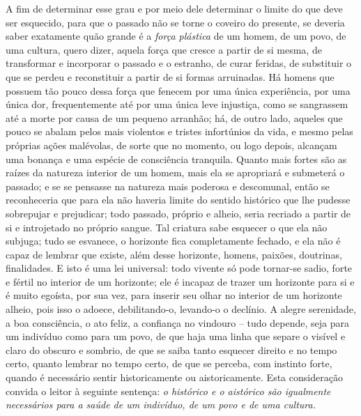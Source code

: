 A fim de determinar esse grau e por meio dele determinar o limite do que
deve ser esquecido, para que o passado não se torne o coveiro do
presente, se deveria saber exatamente quão grande é a \emph{força
plástica} de um homem, de um povo, de uma cultura, quero dizer, aquela
força que cresce a partir de si mesma, de transformar e incorporar o
passado e o estranho, de curar feridas, de substituir o que se perdeu e
reconstituir a partir de si formas arruinadas. Há homens que possuem tão
pouco dessa força que fenecem por uma única experiência, por uma única
dor, frequentemente até por uma única leve injustiça, como se sangrassem
até a morte por causa de um pequeno arranhão; há, de outro lado, aqueles
que pouco se abalam pelos mais violentos e tristes infortúnios da vida,
e mesmo pelas próprias ações malévolas, de sorte que no momento, ou logo
depois, alcançam uma bonança e uma espécie de consciência tranquila.
Quanto mais fortes são as raízes da natureza interior de um homem, mais
ela se apropriará e submeterá o passado; e se se pensasse na natureza
mais poderosa e descomunal, então se reconheceria que para ela não
haveria limite do sentido histórico que lhe pudesse sobrepujar e
prejudicar; todo passado, próprio e alheio, seria recriado a partir de
si e introjetado no próprio sangue. Tal criatura sabe esquecer o que ela
não subjuga; tudo se esvanece, o horizonte fica completamente fechado, e
ela não é capaz de lembrar que existe, além desse horizonte, homens,
paixões, doutrinas, finalidades. E isto é uma lei universal: todo
vivente só pode tornar-se sadio, forte e fértil no interior de um
horizonte; ele é incapaz de trazer um horizonte para si e é muito
egoísta, por sua vez, para inserir seu olhar no interior de um horizonte
alheio, pois isso o adoece, debilitando-o, levando-o o declínio. A
alegre serenidade, a boa consciência, o ato feliz, a confiança no
vindouro -- tudo depende, seja para um indivíduo como para um povo, de
que haja uma linha que separe o visível e claro do obscuro e sombrio, de
que se saiba tanto esquecer direito e no tempo certo, quanto lembrar no
tempo certo, de que se perceba, com instinto forte, quando é necessário
sentir historicamente ou aistoricamente. Esta consideração convida o
leitor à seguinte sentença: \emph{o histórico e o aistórico são
igualmente necessários para a saúde de um indivíduo, de um povo e de uma
cultura.}

